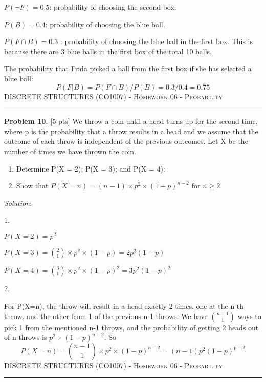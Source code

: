 \documentclass[12pt]{amsart}
\begin{document}
$\displaystyle P(\neg F) = 0.5$: probability of choosing the second box.

$\displaystyle P(B) = 0.4$: probability of choosing the blue ball.

$\displaystyle P(F\cap B) = 0.3$ : probability of choosing the blue ball in the first box. This is because there are 3 blue balls in the first box of the total 10 balls.

The probability that Frida picked a ball from the first box if she has selected a blue ball: \[P(F|B) = P(F\cap B)/P(B) = 0.3/0.4 = \mathbf{0.75}\]
\newpage
{\scshape } \hfill {\scshape DISCRETE STRUCTURES (CO1007) - Homework 06 - Probability} \hfill {\scshape }
 
\smallskip

\hrule

\bigskip

\bigskip 
\textbf{Problem 10. }[5 pts] We throw a coin until a head turns up for the second time, where p is the probability
that a throw results in a head and we assume that the outcome of each throw is independent of the previous
outcomes. Let X be the number of times we have thrown the coin.
\begin{enumerate}
    \item Determine P(X = 2); P(X = 3); and P(X = 4):
    \item Show that $P(X = n)= (n-1)\times p^2 \times (1-p)^{n-2}$ for $n\geq2$
\end{enumerate}
\bigskip

\textit{Solution}:

1.

$P(X=2) = p^2$

$P(X=3) = \binom{2}{1}\times p^2\times(1-p)=2p^2(1-p)$

$P(X=4) = \binom{3}{1}\times p^2\times (1-p)^2=3p^2(1-p)^2$

2.

For P(X=n), the throw will result in a head exactly 2 times, one at the n-th throw, and the other from 1 of the previous n-1 throws. We have $\binom{n-1}{1}$ ways to pick 1 from the mentioned n-1 throws, and the probability of getting 2 heads out of n throws is $p^2\times(1-p)^{n-2}$. So \[P(X=n) = \binom{n-1}{1}\times p^2\times(1-p)^{n-2}=(n-1)p^2(1-p)^{p-2}\]
\newpage
{\scshape } \hfill {\scshape DISCRETE STRUCTURES (CO1007) - Homework 06 - Probability} \hfill {\scshape }
 
\smallskip

\hrule

\bigskip
\end{document}
